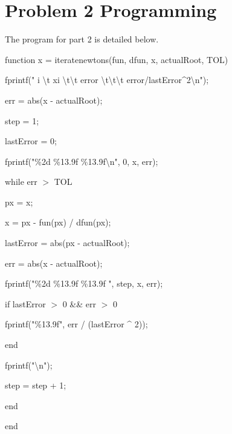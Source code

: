 \documentclass{article}
\begin{document}
\section*{Problem 2 Programming}
\begin{lstProgramming}
The program for part 2 is detailed below.
\vspace{1mm}

function x = iteratenewtons(fun, dfun, x, actualRoot, TOL)

fprintf(" i \backslash t\hspace{1mm} xi \hspace{1mm}\backslash t\hspace{1mm}\backslash t\hspace{1mm}   error\hspace{1mm} \backslash t\hspace{1mm}\backslash t\hspace{1mm}\backslash t \hspace{1mm}error/lastError^2\backslash n");

\hspace{5mm}err = abs(x - actualRoot);

\hspace{5mm}step = 1;

\hspace{5mm}lastError = 0;

\hspace{5mm}fprintf("\%2d \%13.9f \%13.9f\backslash n", 0, x, err);

\hspace{5mm}while err $>$ TOL

\hspace{10mm}px = x;
        
\hspace{10mm}x = px - fun(px) / dfun(px);
        
\hspace{10mm}lastError = abs(px - actualRoot);
        
\hspace{10mm}err = abs(x - actualRoot);
        
\hspace{10mm}fprintf("\%2d \%13.9f \%13.9f ", step, x, err);

\hspace{10mm}if lastError $>$ 0 \&\& err $>$ 0

\hspace{15mm}fprintf("\%13.9f", err / (lastError ^ 2));

\hspace{10mm}end

\hspace{10mm}fprintf("\backslash n");

\hspace{10mm}step = step + 1;

\hspace{5mm}end

end

\end{lstProgramming}
\end{document}
